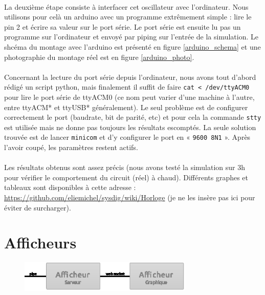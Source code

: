 \documentclass{article}
\begin{document}
\paragraph{}La deuxième étape consiste à interfacer cet oscillateur avec l'ordinateur. Nous utilisons pour celà un arduino avec un programme extrêmement simple : lire le pin 2 et écrire sa valeur sur le port série. Le port série est ensuite lu pas un programme sur l'ordinateur et envoyé par piping sur l'entrée de la simulation. Le shcéma du montage avec l'arduino est présenté en figure \ref{arduino_schema} et une photographie du montage réel est en figure \ref{arduino_photo}.

\paragraph{}Concernant la lecture du port série depuis l'ordinateur, nous avons tout d'abord rédigé un script python, mais finalement il suffit de faire \texttt{cat < /dev/ttyACM0} pour lire le port série de ttyACM0 (ce nom peut varier d'une machine à l'autre, entre ttyACM* et ttyUSB* généralement). Le seul problème est de configurer correctement le port (baudrate, bit de parité, etc) et pour cela la commande \texttt{stty} est utilisée mais ne donne pas toujours les résultats escomptés. La seule solution trouvée est de lancer \texttt{minicom} et d'y configurer le port en « \texttt{9600 8N1} ». Après l'avoir coupé, les paramètres restent actifs.


\paragraph{}Les résultats obtenus sont assez précis (nous avons testé la simulation sur 3h pour vérifier le comportement du circuit (réel) à chaud). Différents graphes et tableaux sont disponibles à cette adresse : \url{https://github.com/eliemichel/sysdig/wiki/Horloge} (je ne les insère pas ici pour éviter de surcharger).


\section{Afficheurs}

\begin{figure}[h]
\centering
\includegraphics[height=4em]{zoom_output.eps}
\end{figure}
\end{document}
